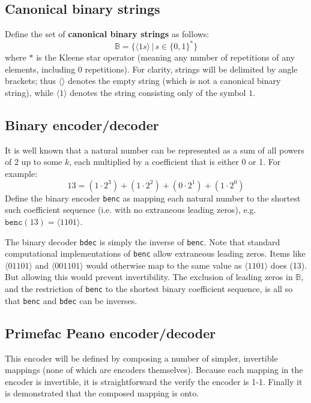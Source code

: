 \documentclass[12pt,reqno]{article}
\begin{document}
\subsection{Canonical binary strings}

Define the set of \textbf{canonical binary strings} as follows:
\begin{equation}
  \mathbb{B} = \{ \langle 1s \rangle \, | \, s \in \{0,1\}^{*} \}
\end{equation}
where $*$ is the Kleene star operator (meaning any number of repetitions of any elements, including 0 repetitions). For clarity, strings will be delimited by angle brackets; thus $\langle \rangle$ denotes the empty string (which is not a canonical binary string), while $\langle 1 \rangle$ denotes the string consisting only of the symbol $1$.

\subsection{Binary encoder/decoder}

It is well known that a natural number can be represented as a sum of all powers of 2 up to some $k$, each multiplied by a coefficient that is either 0 or 1. For example:
\begin{equation}
  13 = (1 \cdot 2^3) + (1 \cdot 2^2) + (0 \cdot 2^1) + (1 \cdot 2^0)
\end{equation}
Define the binary encoder \texttt{benc} as mapping each natural number to the shortest such coefficient sequence (i.e. with no extraneous leading zeros), e.g. $\texttt{benc}(13) = \langle 1101 \rangle$.

The binary decoder \texttt{bdec} is simply the inverse of \texttt{benc}. Note that standard computational implementations of \texttt{benc} allow extraneous leading zeros. Items like $\langle 01101 \rangle$ and $\langle 001101 \rangle$ would otherwise map to the same value as $\langle 1101 \rangle$ does (13). But allowing this would prevent invertibility. The exclusion of leading zeros in $\mathbb{B}$, and the restriction of \texttt{benc} to the shortest binary coefficient sequence, is all so that \texttt{benc} and \texttt{bdec} can be inverses.

\subsection{Primefac Peano encoder/decoder}

This encoder will be defined by composing a number of simpler, invertible mappings (none of which are encoders themselves). Because each mapping in the encoder is invertible, it is straightforward the verify the encoder is 1-1. Finally it is demonstrated that the composed mapping is onto.
\end{document}
